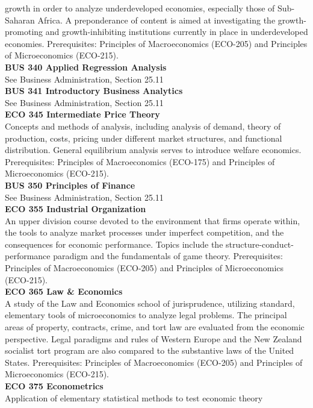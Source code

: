 \documentclass[
  letterpaper,
]{scrbook}
\begin{document}
growth in order to analyze underdeveloped economies, especially those of
Sub-Saharan Africa. A preponderance of content is aimed at investigating
the growth-promoting and growth-inhibiting institutions currently in
place in underdeveloped economies. Prerequisites: Principles of
Macroeconomics (ECO-205) and Principles of Microeconomics (ECO-215).\\
\textbf{BUS 340 Applied Regression Analysis}\\
See Business Administration, Section 25.11\\
\textbf{BUS 341 Introductory Business Analytics}\\
See Business Administration, Section 25.11\\
\textbf{ECO 345 Intermediate Price Theory}\\
Concepts and methods of analysis, including analysis of demand, theory
of production, costs, pricing under different market structures, and
functional distribution. General equilibrium analysis serves to
introduce welfare economics. Prerequisites: Principles of Macroeconomics
(ECO-175) and Principles of Microeconomics (ECO-215).\\
\textbf{BUS 350 Principles of Finance}\\
See Business Administration, Section 25.11\\
\textbf{ECO 355 Industrial Organization}\\
An upper division course devoted to the environment that firms operate
within, the tools to analyze market processes under imperfect
competition, and the consequences for economic performance. Topics
include the structure-conduct-performance paradigm and the fundamentals
of game theory. Prerequisites: Principles of Macroeconomics (ECO-205)
and Principles of Microeconomics (ECO-215).\\
\textbf{ECO 365 Law \& Economics}\\
A study of the Law and Economics school of jurisprudence, utilizing
standard, elementary tools of microeconomics to analyze legal problems.
The principal areas of property, contracts, crime, and tort law are
evaluated from the economic perspective. Legal paradigms and rules of
Western Europe and the New Zealand socialist tort program are also
compared to the substantive laws of the United States. Prerequisites:
Principles of Macroeconomics (ECO-205) and Principles of Microeconomics
(ECO-215).\\
\textbf{ECO 375 Econometrics}\\
Application of elementary statistical methods to test economic theory
\end{document}
